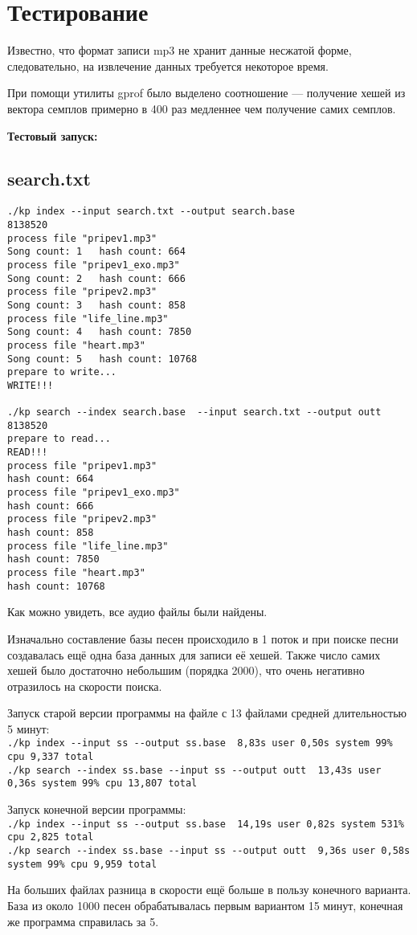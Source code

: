 \documentclass[12pt]{article}
\newcommand{\se}[1]{\section*{\bf #1}}
\newcommand{\lst}[2]{
	\subsection*{\textbf{#2}}
	{\footnotesize
	
	}
}
\begin{document}
\se{Тестирование}

Известно, что формат записи mp3 не хранит данные несжатой форме, следовательно, на
извлечение данных требуется некоторое время.

При помощи утилиты gprof было выделено соотношение --- получение хешей из вектора
семплов примерно в 400 раз медленнее чем получение самих семплов.

\textbf{Тестовый запуск:}
\lst{../../kp}{search.txt}
\begin{lstlisting}[style=empty]
./kp index --input search.txt --output search.base
8138520
process file "pripev1.mp3" 
Song count: 1	hash count: 664
process file "pripev1_exo.mp3" 
Song count: 2	hash count: 666
process file "pripev2.mp3" 
Song count: 3	hash count: 858
process file "life_line.mp3" 
Song count: 4	hash count: 7850
process file "heart.mp3" 
Song count: 5	hash count: 10768
prepare to write...
WRITE!!!

./kp search --index search.base  --input search.txt --output outt
8138520
prepare to read...
READ!!!
process file "pripev1.mp3" 
hash count: 664
process file "pripev1_exo.mp3" 
hash count: 666
process file "pripev2.mp3" 
hash count: 858
process file "life_line.mp3" 
hash count: 7850
process file "heart.mp3" 
hash count: 10768
\end{lstlisting}

Как можно увидеть, все аудио файлы были найдены.

Изначально составление базы песен происходило в 1 поток и при поиске песни
создавалась ещё одна база данных для записи её хешей. Также число самих хешей
было достаточно небольшим (порядка 2000), что очень негативно отразилось на
скорости поиска.

Запуск старой версии программы на файле с 13 файлами средней длительностью 5 минут:\\
\lstinline{./kp index --input ss --output ss.base  8,83s user 0,50s system 99% cpu 9,337 total}\\
\lstinline{./kp search --index ss.base --input ss --output outt  13,43s user 0,36s system 99% cpu 13,807 total}


Запуск конечной версии программы:\\
\lstinline{./kp index --input ss --output ss.base  14,19s user 0,82s system 531% cpu 2,825 total}\\
\lstinline{./kp search --index ss.base --input ss --output outt  9,36s user 0,58s system 99% cpu 9,959 total}

На больших файлах разница в скорости ещё больше в пользу конечного варианта. База из около
1000 песен обрабатывалась первым вариантом 15 минут, конечная же программа справилась за 5.
\end{document}
